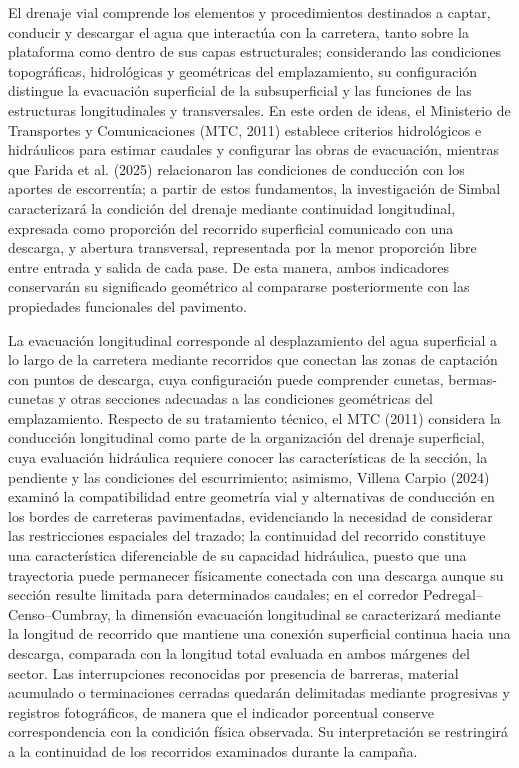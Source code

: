 
El drenaje vial comprende los elementos y procedimientos destinados a captar, conducir y descargar el agua que interactúa con la carretera, tanto sobre la plataforma como dentro de sus capas estructurales; considerando las condiciones topográficas, hidrológicas y geométricas del emplazamiento, su configuración distingue la evacuación superficial de la subsuperficial y las funciones de las estructuras longitudinales y transversales. En este orden de ideas, el Ministerio de Transportes y Comunicaciones (MTC, 2011) establece criterios hidrológicos e hidráulicos para estimar caudales y configurar las obras de evacuación, mientras que Farida et al. (2025) relacionaron las condiciones de conducción con los aportes de escorrentía; a partir de estos fundamentos, la investigación de Simbal caracterizará la condición del drenaje mediante continuidad longitudinal, expresada como proporción del recorrido superficial comunicado con una descarga, y abertura transversal, representada por la menor proporción libre entre entrada y salida de cada pase. De esta manera, ambos indicadores conservarán su significado geométrico al compararse posteriormente con las propiedades funcionales del pavimento.


La evacuación longitudinal corresponde al desplazamiento del agua superficial a lo largo de la carretera mediante recorridos que conectan las zonas de captación con puntos de descarga, cuya configuración puede comprender cunetas, bermas-cunetas y otras secciones adecuadas a las condiciones geométricas del emplazamiento. Respecto de su tratamiento técnico, el MTC (2011) considera la conducción longitudinal como parte de la organización del drenaje superficial, cuya evaluación hidráulica requiere conocer las características de la sección, la pendiente y las condiciones del escurrimiento; asimismo, Villena Carpio (2024) examinó la compatibilidad entre geometría vial y alternativas de conducción en los bordes de carreteras pavimentadas, evidenciando la necesidad de considerar las restricciones espaciales del trazado; la continuidad del recorrido constituye una característica diferenciable de su capacidad hidráulica, puesto que una trayectoria puede permanecer físicamente conectada con una descarga aunque su sección resulte limitada para determinados caudales; en el corredor Pedregal–Censo–Cumbray,  la dimensión evacuación longitudinal se caracterizará mediante la longitud de recorrido que mantiene una conexión superficial continua hacia una descarga, comparada con la longitud total evaluada en ambos márgenes del sector. Las interrupciones reconocidas por presencia de barreras, material acumulado o terminaciones cerradas quedarán delimitadas mediante progresivas y registros fotográficos, de manera que el indicador porcentual conserve correspondencia con la condición física observada. Su interpretación se restringirá a la continuidad de los recorridos examinados durante la campaña.

